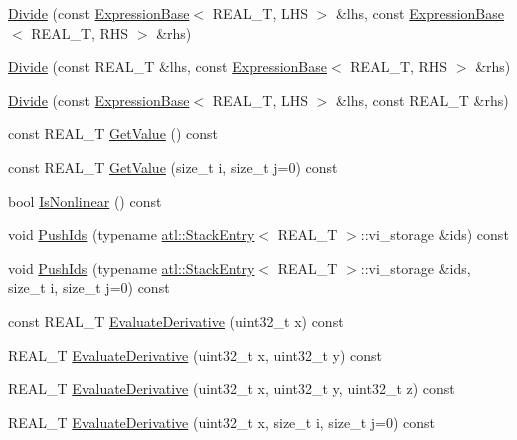 \begin{DoxyCompactItemize}
\item 
\hyperlink{structatl_1_1_divide_a6a73e9fdb3a745ac384b027797a51d64}{Divide} (const \hyperlink{structatl_1_1_expression_base}{Expression\+Base}$<$ R\+E\+A\+L\+\_\+\+T, L\+H\+S $>$ \&lhs, const \hyperlink{structatl_1_1_expression_base}{Expression\+Base}$<$ R\+E\+A\+L\+\_\+\+T, R\+H\+S $>$ \&rhs)
\item 
\hyperlink{structatl_1_1_divide_af1d32dc16af3a699e5bd5c386a4a9e7c}{Divide} (const R\+E\+A\+L\+\_\+\+T \&lhs, const \hyperlink{structatl_1_1_expression_base}{Expression\+Base}$<$ R\+E\+A\+L\+\_\+\+T, R\+H\+S $>$ \&rhs)
\item 
\hyperlink{structatl_1_1_divide_ad9933af702709a62b3f4fb3fd238b0cb}{Divide} (const \hyperlink{structatl_1_1_expression_base}{Expression\+Base}$<$ R\+E\+A\+L\+\_\+\+T, L\+H\+S $>$ \&lhs, const R\+E\+A\+L\+\_\+\+T \&rhs)
\item 
const R\+E\+A\+L\+\_\+\+T \hyperlink{structatl_1_1_divide_ae639697a3d873b9b027dc6ce6df195ad}{Get\+Value} () const 
\item 
const R\+E\+A\+L\+\_\+\+T \hyperlink{structatl_1_1_divide_aee55c50583b536e4a6ef6e32b02d4054}{Get\+Value} (size\+\_\+t i, size\+\_\+t j=0) const 
\item 
bool \hyperlink{structatl_1_1_divide_acbea13449c17063d68f61f8afb45ce12}{Is\+Nonlinear} () const 
\item 
void \hyperlink{structatl_1_1_divide_a1364bf196ce7e76665d8cb203786f3d8}{Push\+Ids} (typename \hyperlink{structatl_1_1_stack_entry}{atl\+::\+Stack\+Entry}$<$ R\+E\+A\+L\+\_\+\+T $>$\+::vi\+\_\+storage \&ids) const 
\item 
void \hyperlink{structatl_1_1_divide_a43d0b1a7b9e721fac5388995d873b995}{Push\+Ids} (typename \hyperlink{structatl_1_1_stack_entry}{atl\+::\+Stack\+Entry}$<$ R\+E\+A\+L\+\_\+\+T $>$\+::vi\+\_\+storage \&ids, size\+\_\+t i, size\+\_\+t j=0) const 
\item 
const R\+E\+A\+L\+\_\+\+T \hyperlink{structatl_1_1_divide_a52c08dfa122348405f2122c161dc2883}{Evaluate\+Derivative} (uint32\+\_\+t x) const 
\item 
R\+E\+A\+L\+\_\+\+T \hyperlink{structatl_1_1_divide_aa7c1683046ed7b4f0a8dee864eff549c}{Evaluate\+Derivative} (uint32\+\_\+t x, uint32\+\_\+t y) const 
\item 
R\+E\+A\+L\+\_\+\+T \hyperlink{structatl_1_1_divide_a5cae35f64745a2e85da0f82383fa3b2e}{Evaluate\+Derivative} (uint32\+\_\+t x, uint32\+\_\+t y, uint32\+\_\+t z) const 
\item 
R\+E\+A\+L\+\_\+\+T \hyperlink{structatl_1_1_divide_ad4ac0ce5afaf2098e6c2fe70aca0b9c9}{Evaluate\+Derivative} (uint32\+\_\+t x, size\+\_\+t i, size\+\_\+t j=0) const 

\end{DoxyCompactItemize}
